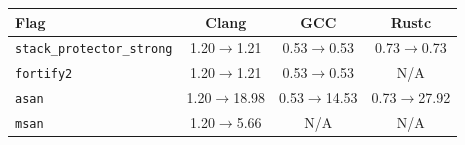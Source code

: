 \begin{tabular*}{\columnwidth}{@{\extracolsep\fill}lccc@{\extracolsep\fill}}
\toprule
\textbf{Flag} & \textbf{Clang} & \textbf{GCC} & \textbf{Rustc} \\
\midrule
\texttt{stack\_protector\_strong} & 1.20$\to$1.21 & 0.53$\to$0.53 & 0.73$\to$0.73 \\
\texttt{fortify2} & 1.20$\to$1.21 & 0.53$\to$0.53 & N/A \\
\texttt{asan} & 1.20$\to$18.98 & 0.53$\to$14.53 & 0.73$\to$27.92 \\
\texttt{msan} & 1.20$\to$5.66 & N/A & N/A \\
\bottomrule
\end{tabular*}

